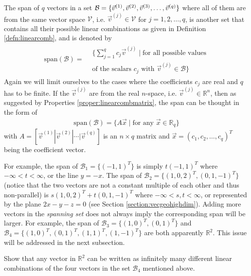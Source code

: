 \begin{defn}[Span]
\label{defn:span}
The span of $q$ vectors in a set $\mathcal{B} = \{\vec{v}^{(1)}, \vec{v}^{(2)}, \vec{v}^{(3)}, \ldots, \\ \vec{v}^{(q)}\}$ where all of them are from the same vector space $\mathcal{V}$, i.e. $\vec{v}^{(j)} \in \mathcal{V}$ for $j = 1, 2, \ldots, q$, is another set that contains all their possible linear combinations as given in Definition \ref{defn:linearcomb}, and is denoted by
\begin{align*}
\text{span}(\mathcal{B}) = \begin{aligned}
&\{\sum_{j=1}^{q} c_j\vec{v}^{(j)} \mid \text{for all possible values} \\    
&\text{of the scalars $c_j$ with $\vec{v}^{(j)} \in \mathcal{B}$}\}
\end{aligned}
\end{align*}
Again we will limit ourselves to the cases where the coefficients $c_j$ are real and $q$ has to be finite. If the $\vec{v}^{(j)}$ are from the real $n$-space, i.e. $\vec{v}^{(j)} \in \mathbb{R}^n$, then as suggested by Properties \ref{proper:linearcombmatrix}, the span can be thought in the form of 
\begin{align*}
\text{span}(\mathcal{B}) = \{A\vec{x} \mid \text{for any } \vec{x} \in \mathbb{R}_q\}
\end{align*}
with $A = [\vec{v}^{(1)}|\vec{v}^{(2)}|\cdots|\vec{v}^{(q)}]$ is an $n \times q$ matrix and
$\vec{x} = (c_1, c_2, \ldots, c_q)^T$ being the coefficient vector.
\end{defn}
For example, the span of $\mathcal{B}_1 = \{(-1,1)^T\}$ is simply $t(-1,1)^T$ where $-\infty < t < \infty$, or the line $y = -x$. The span of $\mathcal{B}_2 = \{(1,0,2)^T, (0,1,-1)^T\}$ (notice that the two vectors are not a constant multiple of each other and thus non-parallel) is $s(1,0,2)^T + t(0,1,-1)^T$ where $-\infty < s,t < \infty$, or represented by the plane $2x - y - z = 0$ (see Section \ref{section:vecgeohighdim}). Adding more vectors in the \textit{spanning set} does not always imply the corresponding span will be larger. For example, the span of $\mathcal{B}_3 = \{(1,0)^T, (0,1)^T\}$ and $\mathcal{B}_4 = \{(1,0)^T, (0,1)^T, (1,1)^T, (1,-1)^T\}$ are both apparently $\mathbb{R}^2$. This issue will be addressed in the next subsection.
\begin{exmp}
\label{exmp:S3S4}
Show that any vector in $\mathbb{R}^2$ can be written as infinitely many different linear combinations of the four vectors in the set $\mathcal{B}_4$ mentioned above.
\end{exmp}

